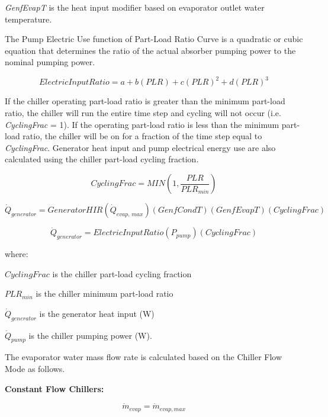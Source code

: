 \emph{GenfEvapT} is the heat input modifier based on evaporator outlet water temperature.

The Pump Electric Use function of Part-Load Ratio Curve is a quadratic or cubic equation that determines the ratio of the actual absorber pumping power to the nominal pumping power.

\begin{equation}
ElectricInputRatio = a + b\left( {PLR} \right) + c{\left( {PLR} \right)^2} + d{\left( {PLR} \right)^3}
\end{equation}

If the chiller operating part-load ratio is greater than the minimum part-load ratio, the chiller will run the entire time step and cycling will not occur (i.e. \emph{CyclingFrac} = 1). If the operating part-load ratio is less than the minimum part-load ratio, the chiller will be on for a fraction of the time step equal to \emph{CyclingFrac}. Generator heat input and pump electrical energy use are also calculated using the chiller part-load cycling fraction.

\begin{equation}
CyclingFrac = MIN\left( {1,\frac{{PLR}}{{PL{R_{min}}}}} \right)
\end{equation}

\begin{equation}
{\dot Q_{generator}} = GeneratorHIR\left( {{{\dot Q}_{evap,\,max}}} \right)\left( {GenfCondT} \right)\left( {GenfEvapT} \right)\left( {CyclingFrac} \right)
\end{equation}

\begin{equation}
{\dot Q_{generator}} = ElectricInputRatio({P_{pump}})(CyclingFrac)
\end{equation}

where:

\(CyclingFrac\) is the chiller part-load cycling fraction

\(PL{R_{min}}\) is the chiller minimum part-load ratio

\({\dot Q_{generator}}\) is the generator heat input (W)

\({\dot Q_{pump}}\) is the chiller pumping power (W).

The evaporator water mass flow rate is calculated based on the Chiller Flow Mode as follows.

\textbf{Constant Flow Chillers:}

\begin{equation}
{\dot m_{evap}} = {\dot m_{evap,max}}
\end{equation}


